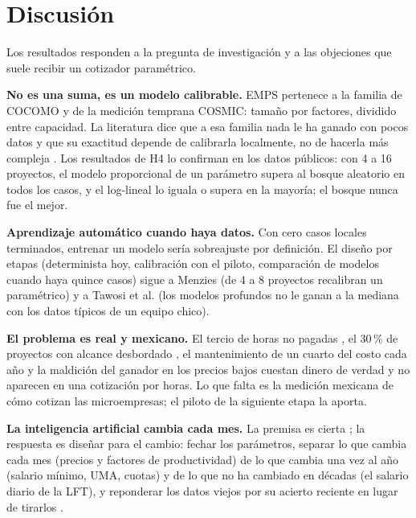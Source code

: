 \documentclass[10pt,twocolumn]{article}
\begin{document}
\section{Discusión}
Los resultados responden a la pregunta de investigación y a las objeciones que suele recibir un cotizador paramétrico.

\textbf{No es una suma, es un modelo calibrable.} EMPS pertenece a la familia de COCOMO y de la medición temprana COSMIC: tamaño por factores, dividido entre capacidad. La literatura dice que a esa familia nada le ha ganado con pocos datos \cite{menzies2017negative,abedu2021machine} y que su exactitud depende de calibrarla localmente, no de hacerla más compleja \cite{jeklin2025evaluation,valdessouto2024merging}. Los resultados de H4 lo confirman en los datos públicos: con 4 a 16 proyectos, el modelo proporcional de un parámetro supera al bosque aleatorio en todos los casos, y el log-lineal lo iguala o supera en la mayoría; el bosque nunca fue el mejor.

\textbf{Aprendizaje automático cuando haya datos.} Con cero casos locales terminados, entrenar un modelo sería sobreajuste por definición. El diseño por etapas (determinista hoy, calibración con el piloto, comparación de modelos cuando haya quince casos) sigue a Menzies (de 4 a 8 proyectos recalibran un paramétrico) y a Tawosi et al. (los modelos profundos no le ganan a la mediana con los datos típicos de un equipo chico).

\textbf{El problema es real y mexicano.} El tercio de horas no pagadas \cite{cravo2025encuesta}, el 30\,\% de proyectos con alcance desbordado \cite{institute2024pulse}, el mantenimiento de un cuarto del costo cada año \cite{riedl2026what} y la maldición del ganador en los precios bajos \cite{jrgensen2014failure2} cuestan dinero de verdad y no aparecen en una cotización por horas. Lo que falta es la medición mexicana de cómo cotizan las microempresas; el piloto de la siguiente etapa la aporta.

\textbf{La inteligencia artificial cambia cada mes.} La premisa es cierta \cite{committee2026ai,chen2024is}; la respuesta es diseñar para el cambio: fechar los parámetros, separar lo que cambia cada mes (precios y factores de productividad) de lo que cambia una vez al año (salario mínimo, UMA, cuotas) y de lo que no ha cambiado en décadas (el salario diario de la LFT), y reponderar los datos viejos por su acierto reciente en lugar de tirarlos \cite{minku2017which}.
\end{document}
